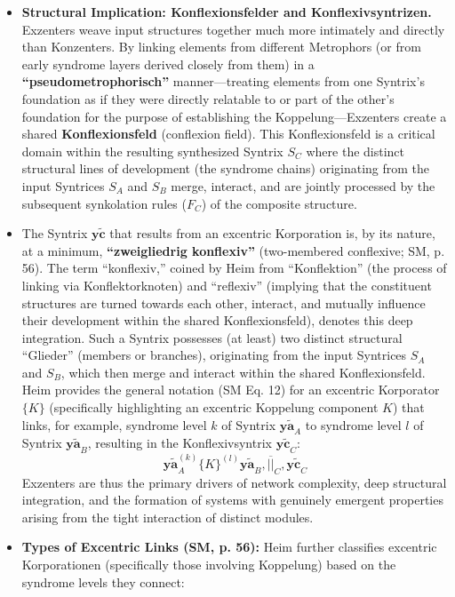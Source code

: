 \documentclass[
    12pt,              %
    a4paper,           %
    headings=normal,   %
    twoside=true,      %
    BCOR=8mm,          %
]{scrbook}
\newcommand{\q}[1]{\enquote{#1}}
\newcommand{\syntrix}{\bm{y\widetilde{a}}}
\newcommand{\konflexivsyntrix}{\bm{y\widetilde{c}}}
\begin{document}
\begin{itemize}
    \item   \textbf{Structural Implication: Konflexionsfelder and Konflexivsyntrizen.} Exzenters weave input structures together much more intimately and directly than Konzenters. By linking elements from different Metrophors (or from early syndrome layers derived closely from them) in a \textbf{\q{pseudometrophorisch}} manner—treating elements from one Syntrix's foundation as if they were directly relatable to or part of the other's foundation for the purpose of establishing the Koppelung—Exzenters create a shared \textbf{Konflexionsfeld} (conflexion field). This Konflexionsfeld is a critical domain within the resulting synthesized Syntrix \(S_C\) where the distinct structural lines of development (the syndrome chains) originating from the input Syntrices \(S_A\) and \(S_B\) merge, interact, and are jointly processed by the subsequent synkolation rules (\(F_C\)) of the composite structure.
    \item   The Syntrix \(\konflexivsyntrix\) that results from an excentric Korporation is, by its nature, at a minimum, \textbf{\q{zweigliedrig konflexiv}} (two-membered conflexive; SM, p. 56). The term \q{konflexiv,} coined by Heim from \q{Konflektion} (the process of linking via Konflektorknoten) and \q{reflexiv} (implying that the constituent structures are turned towards each other, interact, and mutually influence their development within the shared Konflexionsfeld), denotes this deep integration. Such a Syntrix possesses (at least) two distinct structural \q{Glieder} (members or branches), originating from the input Syntrices \(S_A\) and \(S_B\), which then merge and interact within the shared Konflexionsfeld. Heim provides the general notation (SM Eq. 12) for an excentric Korporator \(\{K\}\) (specifically highlighting an excentric Koppelung component \(K\)) that links, for example, syndrome level \(k\) of Syntrix \(\syntrix_A\) to syndrome level \(l\) of Syntrix \(\syntrix_B\), resulting in the Konflexivsyntrix \(\konflexivsyntrix_C\):
        \[ \syntrix_A^{(k)} \{K\}^{(l)} \syntrix_B, \overline{||}_C, \konflexivsyntrix_C \]
        Exzenters are thus the primary drivers of network complexity, deep structural integration, and the formation of systems with genuinely emergent properties arising from the tight interaction of distinct modules.
    \item   \textbf{Types of Excentric Links (SM, p. 56):} Heim further classifies excentric Korporationen (specifically those involving Koppelung) based on the syndrome levels they connect:

\end{itemize}
\end{document}
